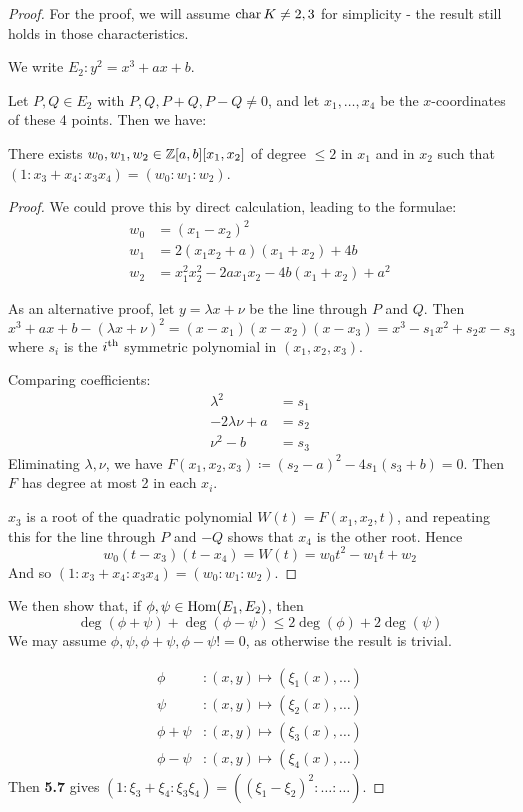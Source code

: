 \documentclass[10pt,a4paper]{article}
\begin{document}
\begin{proof}
For the proof, we will assume $\operatorname{char} K \neq 2, 3$ for simplicity - the result still holds in those characteristics.

We write $E_2: y^2=x^3+ax+b$.

Let $P, Q \in E_2$ with $P, Q, P+Q, P-Q \neq 0$, and let $x_1, \ldots, x_4$ be the $x$-coordinates of these 4 points. Then we have:
\begin{lemma}
  There exists $w_0, w_1, w_2 \in \mathbb{Z}[a,b][x_1,x_2]$ of degree $\leq 2$ in $x_1$ and in $x_2$ such that $(1:x_3+x_4:x_3x_4) = (w_0:w_1:w_2)$.
\end{lemma}
\begin{proof}
  We could prove this by direct calculation, leading to the formulae:
  \begin{align*}
    w_0 &= (x_1-x_2)^2\\
    w_1 &= 2(x_1x_2+a)(x_1+x_2)+4b\\
    w_2 &= x_1^2x_2^2-2ax_1x_2-4b(x_1+x_2)+a^2
  \end{align*}

  As an alternative proof, let $y=\lambda x +\nu$ be the line through $P$ and $Q$. Then
  \[x^3+ax+b-(\lambda x+\nu)^2 = (x-x_1)(x-x_2)(x-x_3) = x^3-s_1x^2+s_2x-s_3\]
  where $s_i$ is the $i\textsuperscript{th}$ symmetric polynomial in $(x_1, x_2, x_3)$.

  Comparing coefficients:
  \begin{align*}
    \lambda^2 &= s_1\\
    -2\lambda\nu+a &= s_2\\
    \nu^2-b &=  s_3
  \end{align*}
  Eliminating $\lambda, \nu$, we have $F(x_1, x_2, x_3) \coloneqq (s_2-a)^2-4s_1(s_3+b)=0$. Then $F$ has degree at most 2 in each $x_i$.

  $x_3$ is a root of the quadratic polynomial $W(t) = F(x_1, x_2, t)$, and repeating this for the line through $P$ and $-Q$ shows that $x_4$ is the other root. Hence
  \[w_0(t-x_3)(t-x_4) = W(t) = w_0t^2-w_1t+w_2\]
  And so $(1:x_3+x_4:x_3x_4) = (w_0:w_1:w_2)$.
\end{proof}

We then show that, if $\phi, \psi \in \operatorname{Hom}(E_1, E_2)$, then
\[ \deg(\phi+\psi) +\deg(\phi-\psi) \leq 2\deg(\phi)+2\deg(\psi)\]
We may assume $\phi, \psi, \phi+\psi, \phi-\psi != 0$, as otherwise the result is trivial.

\begin{align*}
  \phi&: (x, y) \mapsto (\xi_1(x), \ldots)\\
  \psi&: (x, y) \mapsto (\xi_2(x), \ldots)\\
  \phi+\psi&: (x, y) \mapsto (\xi_3(x), \ldots)\\
  \phi-\psi&: (x, y) \mapsto (\xi_4(x), \ldots)
\end{align*}
Then \textbf{5.7} gives $(1:\xi_3+\xi_4:\xi_3\xi_4) = ((\xi_1-\xi_2)^2:\ldots:\ldots)$.


\end{proof}
\end{document}
